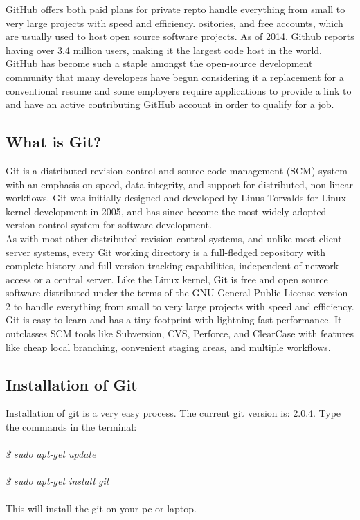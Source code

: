 \noindent GitHub offers both paid plans for private repto handle everything from small to very large projects with speed and efficiency. ositories, and free accounts, which are usually used to host open source software projects. As of 2014, Github reports having over 3.4 million users, making it the largest code host in the world.\\

\noindent GitHub has become such a staple amongst the open-source development community that many developers have begun considering it a replacement for a conventional resume and some employers require applications to provide a link to and have an active contributing GitHub account in order to qualify for a job.

\subsection{What is Git?}
\noindent Git is a distributed revision control and source code management (SCM) system with an emphasis on speed, data integrity, and support for distributed, non-linear workflows. Git was initially designed and developed by Linus Torvalds for Linux kernel development in 2005, and has since become the most widely adopted version control system for software development.\\

\noindent As with most other distributed revision control systems, and unlike most client–server systems, every Git working directory is a full-fledged repository with complete history and full version-tracking capabilities, independent of network access or a central server. Like the Linux kernel, Git is free and open source software distributed under the terms of the GNU General Public License version 2 to handle everything from small to very large projects with speed and efficiency.\\

\noindent Git is easy to learn and has a tiny footprint with lightning fast performance. It outclasses SCM tools like Subversion, CVS, Perforce, and ClearCase with features like cheap local branching, convenient staging areas, and multiple workflows.

\subsection{Installation of Git}

Installation of git is a very easy process.
The current git version is: 2.0.4.
Type the commands in the terminal:\\\\
\emph{
\$ sudo apt-get update\\\\
\$ sudo apt-get install git\\\\}
This will install the git on your pc or laptop.


